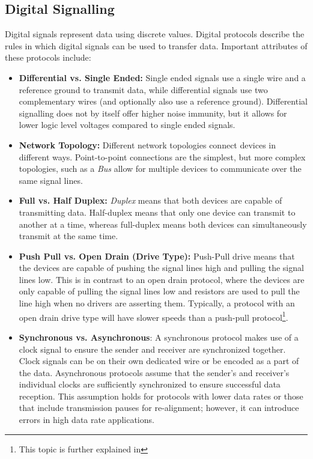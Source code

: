 \documentclass[main.tex]{subfiles}
\begin{document}
\subsection{Digital Signalling}
Digital signals represent data using discrete values. Digital protocols describe the rules in which digital signals can be used to transfer data. Important attributes of these protocols include:
\begin{itemize}
    \item \textbf{Differential vs. Single Ended:} Single ended signals use a single wire and a reference ground to transmit data, while differential signals use two complementary wires (and optionally also use a reference ground). Differential signalling does not by itself offer higher noise immunity, but it allows for lower logic level voltages compared to single ended signals. %
    \item \textbf{Network Topology:} Different network topologies connect devices in different ways. Point-to-point connections are the simplest, but more complex topologies, such as a \textit{Bus} allow for multiple devices to communicate over the same signal lines.
    \item \textbf{Full vs. Half Duplex:} \textit{Duplex} means that both devices are capable of transmitting data. Half-duplex means that only one device can transmit to another at a time, whereas full-duplex means both devices can simultaneously transmit at the same time. 
    \item \textbf{Push Pull vs. Open Drain (Drive Type):} Push-Pull drive means that the devices are capable of pushing the signal lines high and pulling the signal lines low. This is in contrast to an open drain protocol, where the devices are only capable of pulling the signal lines low and resistors are used to pull the line high when no drivers are asserting them. Typically, a protocol with an open drain drive type will have slower speeds than a push-pull protocol\footnote{This topic is further explained in }.
    \item \textbf{Synchronous vs. Asynchronous}: A synchronous protocol makes use of a clock signal to ensure the sender and receiver are synchronized together. Clock signals can be on their own dedicated wire or be encoded as a part of the data. Asynchronous protocols assume that the sender's and receiver's individual clocks are sufficiently synchronized to ensure successful data reception. This assumption holds for protocols with lower data rates or those that include transmission pauses for re-alignment; however, it can introduce errors in high data rate applications.

\end{itemize}
\end{document}
